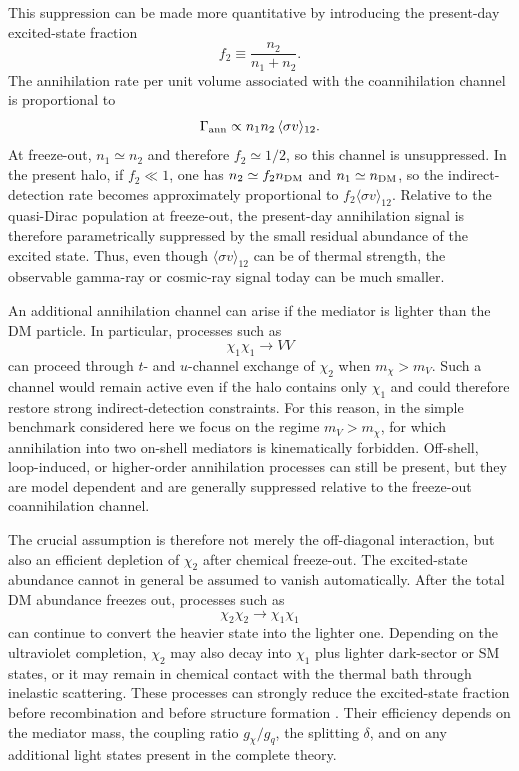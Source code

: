 \documentclass[aps,prd,reprint,superscriptaddress,nofootinbib,longbibliography,floatfix]{revtex4-2}
\begin{document}
This suppression can be made more quantitative by introducing the present-day excited-state fraction
\begin{equation}
f_2\equiv\frac{n_2}{n_1+n_2}.
\end{equation}
The annihilation rate per unit volume associated with the coannihilation channel is proportional to
\begin{equation}
\Gamma_{\rm ann}\propto n_1n_2\,\langle\sigma v\rangle_{12}.
\end{equation}
At freeze-out, $n_1\simeq n_2$ and therefore $f_2\simeq1/2$, so this channel is unsuppressed. In the present halo, if $f_2\ll1$, one has $n_2\simeq f_2 n_{\rm DM}$ and $n_1\simeq n_{\rm DM}$, so the indirect-detection rate becomes approximately proportional to $f_2\langle\sigma v\rangle_{12}$. Relative to the quasi-Dirac population at freeze-out, the present-day annihilation signal is therefore parametrically suppressed by the small residual abundance of the excited state. Thus, even though $\langle\sigma v\rangle_{12}$ can be of thermal strength, the observable gamma-ray or cosmic-ray signal today can be much smaller.

An additional annihilation channel can arise if the mediator is lighter than the DM particle. In particular, processes such as
\begin{equation}
\chi_1\chi_1\rightarrow VV
\end{equation}
can proceed through $t$- and $u$-channel exchange of $\chi_2$ when $m_\chi>m_V$. Such a channel would remain active even if the halo contains only $\chi_1$ and could therefore restore strong indirect-detection constraints. For this reason, in the simple benchmark considered here we focus on the regime $m_V>m_\chi$, for which annihilation into two on-shell mediators is kinematically forbidden. Off-shell, loop-induced, or higher-order annihilation processes can still be present, but they are model dependent and are generally suppressed relative to the freeze-out coannihilation channel.

The crucial assumption is therefore not merely the off-diagonal interaction, but also an efficient depletion of $\chi_2$ after chemical freeze-out. The excited-state abundance cannot in general be assumed to vanish automatically. After the total DM abundance freezes out, processes such as
\begin{equation}
\chi_2\chi_2\rightarrow\chi_1\chi_1
\end{equation}
can continue to convert the heavier state into the lighter one. Depending on the ultraviolet completion, $\chi_2$ may also decay into $\chi_1$ plus lighter dark-sector or SM states, or it may remain in chemical contact with the thermal bath through inelastic scattering. These processes can strongly reduce the excited-state fraction before recombination and before structure formation \cite{CarrilloGonzalez2021,Brahma2023,Chao2023Excited}. Their efficiency depends on the mediator mass, the coupling ratio $g_\chi/g_q$, the splitting $\delta$, and on any additional light states present in the complete theory.
\end{document}

